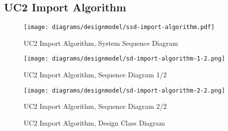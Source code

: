 \subsection{UC2 Import Algorithm}
\begin{figure}[H]
    \centering
    \texttt{[image: diagrams/designmodel/ssd-import-algorithm.pdf]}
    \caption{UC2 Import Algorithm, System Sequence Diagram}
    \label{fig:import-algorithm-ssd}
\end{figure}
\begin{figure}[p]%
  \begin{leftfullpage}
    \texttt{[image: diagrams/designmodel/sd-import-algorithm-1-2.png]}
    \caption{UC2 Import Algorithm, Sequence Diagram 1/2}
    \label{fig:import-algorithm-sd-1}
  \end{leftfullpage}
\end{figure}
\begin{figure}[p]%
  \begin{fullpage}
    \texttt{[image: diagrams/designmodel/sd-import-algorithm-2-2.png]}
    \caption{UC2 Import Algorithm, Sequence Diagram 2/2}
    \label{fig:import-algorithm-sd-2}
  \end{fullpage}
\end{figure}
\begin{figure}[H]
    \centering
    \caption{UC2 Import Algorithm, Design Class Diagram}
    \label{fig:import-algorithm-dcd}
\end{figure}
\newpage
% 
